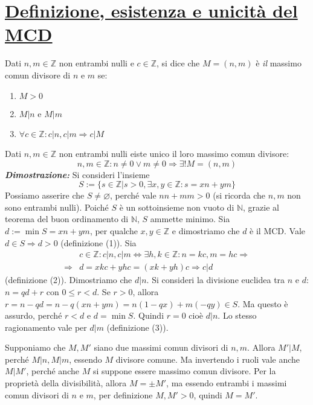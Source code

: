 \section{\underline{Definizione, esistenza e unicità del MCD}}
\begin{tcolorbox}[colback=yellow!30, colframe=yellow!30!black, title=Massimo Comun Divisore]
Dati $n,m \in \mathbb{Z}$ non entrambi nulli e $c\in\mathbb{Z}$, si dice che
$M = (n,m)$ è \textit{il} massimo comun divisore di $n$ e $m$ se:
\begin{enumerate}
    \item $M>0$
    \item $M|n$ e $M|m$
    \item $\forall c\in\mathbb{Z}:c|n, c|m \Longrightarrow c|M$
\end{enumerate}
\end{tcolorbox}
\begin{tcolorbox}[title={Esistenza e unicità del massimo comun divisore}]
Dati $n,m \in \mathbb{Z}$ non entrambi nulli eiste unico il loro
massimo comun divisore: \[ n,m \in \mathbb{Z}: n \not = 0 \vee m \not = 0 \Longrightarrow \exists! M = (n,m) \]
\emph{\textbf{Dimostrazione:}}  Si consideri l'insieme
\[S := \{s \in \mathbb{Z}| s > 0, \exists x,y \in \mathbb{Z}: s = xn + ym\}\]
Possiamo asserire che $S \not = \varnothing$, perché vale $nn + mm > 0$
(si ricorda che $n,m$ non sono entrambi nulli). Poiché $S$ è un sottoinsieme non vuoto
di $\mathbb{N}$, grazie al teorema del buon ordinamento di $\mathbb{N}$, $S$
ammette minimo. Sia $d:= \min S = xn + ym$, per qualche $x,y\in\mathbb{Z}$ e dimostriamo che
$d$ è il MCD. Vale $d\in S\Longrightarrow d>0$ (definizione (1)). Sia
\begin{align*}
    &c\in\mathbb{Z}: c|n,c|m \Leftrightarrow \exists h,k\in\mathbb{Z}:n=kc,m=hc \Rightarrow\\
    \Rightarrow&d = xkc + yhc = (xk + yh)c \Rightarrow c|d
\end{align*}
(definizione (2)).  Dimostriamo che $d|n$.
Si consideri la divisione euclidea tra $n$ e $d$: $n = qd + r$ con
$0 \leq r < d$. Se $r > 0$, allora $r = n - qd = n - q(xn + ym) = n(1-qx) +
m(-qy) \in S$. Ma questo è assurdo, perché $r<d$ e $d = \min S$. Quindi
$r=0$ cioè $d|n$. Lo stesso ragionamento vale per $d|m$ (definizione (3)).

 Supponiamo che $M,M'$ siano due massimi comun
divisori di $n,m$. Allora $M'|M$, perché $M|n,M|m$, essendo $M$ divisore
comune. Ma invertendo i ruoli vale anche $M|M'$, perché anche $M$ si
suppone essere massimo comun divisore. Per la proprietà della divisibilità,
allora $M = \pm M'$, ma essendo entrambi i massimi comun divisori di $n$
e $m$, per definizione $M,M'>0$, quindi $M=M'$.
\cvd
\end{tcolorbox}

